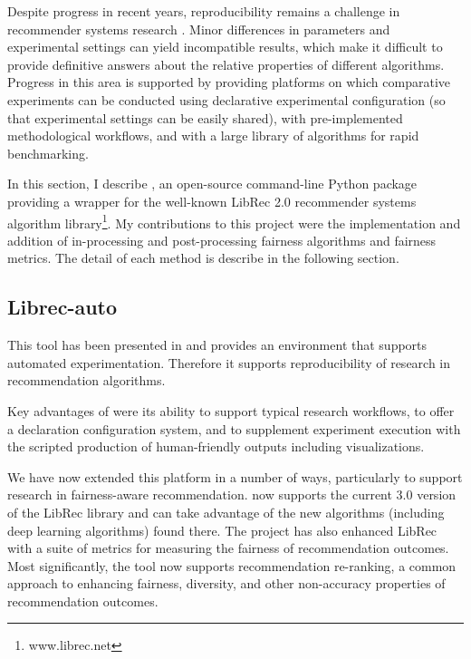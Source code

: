 
Despite progress in recent years, reproducibility remains a challenge in recommender systems research \cite{beel2016towards}. Minor differences in parameters and experimental settings can yield incompatible results, which make it difficult to provide definitive answers about the relative properties of different algorithms. Progress in this area is supported by providing platforms on which comparative experiments can be conducted using declarative experimental configuration (so that experimental settings can be easily shared), with pre-implemented methodological workflows, and with a large library of algorithms for rapid benchmarking. 

In this section, I describe \libauto{}, an open-source command-line Python package providing a wrapper for the well-known LibRec 2.0 recommender systems algorithm library\footnote{www.librec.net}. My contributions to this project were the implementation and addition of in-processing and post-processing fairness algorithms and fairness metrics. The detail of each method is describe in the following section.

\subsection{Librec-auto}
This tool has been presented in \cite{mansoury2018automating} and provides an environment that supports automated experimentation. Therefore it supports reproducibility of research in recommendation algorithms.

Key advantages of \libauto{} were its ability to support typical research workflows, to offer a declaration configuration system, and to supplement experiment execution with the scripted production of human-friendly outputs including visualizations.

We have now extended this platform in a number of ways, particularly to support research in fairness-aware recommendation. \libauto{} now supports the current 3.0 version of the LibRec library and can take advantage of the new algorithms (including deep learning algorithms) found there. The \libauto{} project has also enhanced LibRec with a suite of metrics for measuring the fairness of recommendation outcomes. Most significantly, the tool now supports recommendation re-ranking, a common approach to enhancing fairness, diversity, and other non-accuracy properties of recommendation outcomes.

